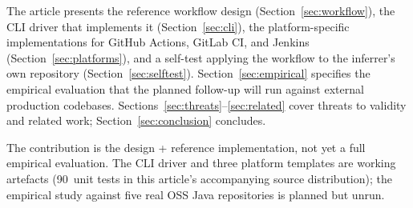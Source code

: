 The article presents the reference workflow design (Section~\ref{sec:workflow}), the CLI driver that implements it (Section~\ref{sec:cli}), the platform-specific implementations for GitHub Actions, GitLab CI, and Jenkins (Section~\ref{sec:platforms}), and a self-test applying the workflow to the inferrer's own repository (Section~\ref{sec:selftest}). Section~\ref{sec:empirical} specifies the empirical evaluation that the planned follow-up will run against external production codebases. Sections~\ref{sec:threats}--\ref{sec:related} cover threats to validity and related work; Section~\ref{sec:conclusion} concludes.

The contribution is the design + reference implementation, not yet a full empirical evaluation. The CLI driver and three platform templates are working artefacts (90~unit tests in this article's accompanying source distribution); the empirical study against five real OSS Java repositories is planned but unrun.
